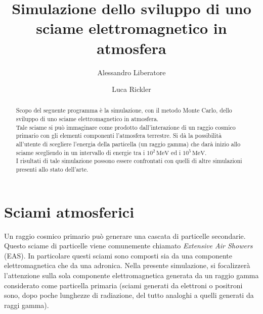 \documentclass[10pt,a4paper,usenatbib]{article}
\newcommand*{\unit}[1]{\ensuremath{\mathrm{\,#1}}}                              %
\begin{document}
\author{Alessandro Liberatore \and Luca Rickler}
\title{Simulazione dello sviluppo di uno sciame elettromagnetico in atmosfera}
\maketitle


\pagebreak
\tableofcontents
\pagebreak



\pagebreak

\begin{abstract}
Scopo del seguente programma è la simulazione, con il metodo Monte Carlo, dello sviluppo di uno sciame elettromagnetico in atmosfera. 
\\Tale sciame si può immaginare come prodotto dall'interazione di un raggio cosmico primario con gli elementi componenti l'atmosfera terrestre. Si dà la possibilità all'utente di scegliere l'energia della particella (un raggio gamma) che darà inizio allo sciame scegliendo in un intervallo di energie tra i $10^2\unit{MeV}$ ed i $10^5\unit{MeV}$. 
\\I risultati di tale simulazione possono essere confrontati con quelli di altre simulazioni presenti allo stato dell'arte. 
\end{abstract}



\section{Sciami atmosferici}
Un raggio cosmico primario può generare una cascata di particelle secondarie. Questo sciame di particelle viene comunemente chiamato \textit{Extensive Air Showers} (EAS). In particolare questi sciami sono composti sia da una componente elettromagnetica che da una adronica. Nella presente simulazione, si focalizzerà l'attenzione sulla sola componente elettromagnetica generata da un raggio gamma considerato come particella primaria (sciami generati da elettroni o positroni sono, dopo poche lunghezze di radiazione, del tutto analoghi a quelli generati da raggi gamma). 
\end{document}
